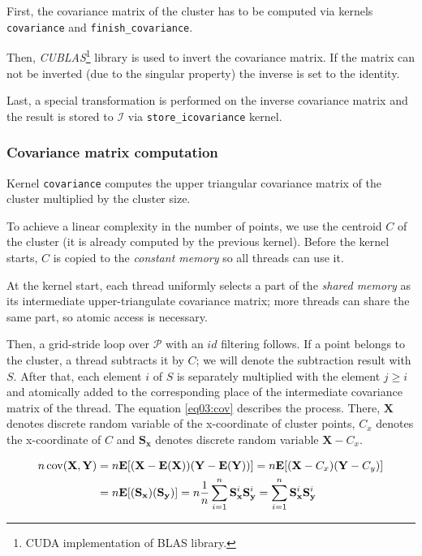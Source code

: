 First, the covariance matrix of the cluster has to be computed via kernels \texttt{covariance} and \texttt{finish\_covariance}. 

Then, \emph{CUBLAS}\footnote{CUDA implementation of BLAS library.} library is used to invert the covariance matrix. If the matrix can not be inverted (due to the singular property) the inverse is set to the identity. 

Last, a special transformation is performed on the inverse covariance matrix and the result is stored to $\mathcal{I}$ via \texttt{store\_icovariance} kernel.

\subsubsection{Covariance matrix computation}

Kernel \texttt{covariance} computes the upper triangular covariance matrix of the cluster multiplied by the cluster size. 

To achieve a linear complexity in the number of points, we use the centroid $C$ of the cluster (it is already computed by the previous kernel). Before the kernel starts, $C$ is copied to the \emph{constant memory} so all threads can use it.

At the kernel start, each thread uniformly selects a part of the \emph{shared memory} as its intermediate upper-triangulate covariance matrix; more threads can share the same part, so atomic access is necessary.

Then, a grid-stride loop over $\mathcal{P}$ with an $id$ filtering follows. If a point belongs to the cluster, a thread subtracts it by $C$; we will denote the subtraction result with $S$. After that, each element $i$ of $S$ is separately multiplied with the element $j \ge i$ and atomically added to the corresponding place of the intermediate covariance matrix of the thread. The equation \ref{eq03:cov} describes the process. There, $\textbf{X}$ denotes discrete random variable of the x-coordinate of cluster points, $C_x$ denotes the x-coordinate of $C$ and $\mathbf{S_x}$ denotes discrete random variable $\mathbf{X}-C_x$.

\begin{equation}
\begin{split}
n\operatorname{cov}(\mathbf{X},\mathbf{Y}) &= n\mathbf{E}[(\mathbf{X}-\mathbf{E}(\mathbf{X}))(\mathbf{Y}-\mathbf{E}(\mathbf{Y}))] = n\mathbf{E}[(\mathbf{X}-C_x)(\mathbf{Y}-C_y)] \\ &= n\mathbf{E}[(\mathbf{S_x})(\mathbf{S_y})] = n\frac{1}{n}\sum_{i=1}^{n}{\mathbf{S}_{\mathbf{x}}^{i}\mathbf{S}_{\mathbf{y}}^{i}} = \sum_{i=1}^{n}{\mathbf{S}_{\mathbf{x}}^{i}\mathbf{S}_{\mathbf{y}}^{i}}
\end{split}
\label{eq03:cov}
\end{equation}

